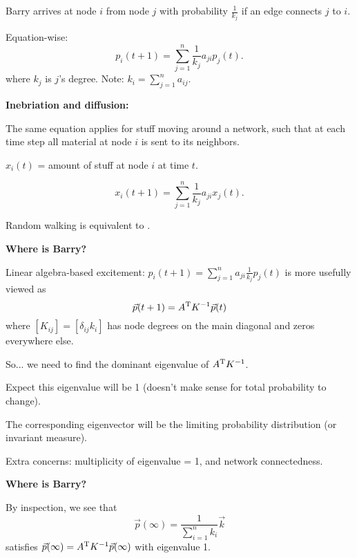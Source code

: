     Barry arrives at node $i$ from node $j$ with probability
    $\frac{1}{k_j}$ if an edge connects $j$ to $i$.
  
    Equation-wise:
    $$
      p_i(t+1) = \sum_{j=1}^{n} \frac{1}{k_j}  a_{ji} p_j(t).
    $$
    where $k_j$ is $j$'s degree.
    {Note: $k_i = \sum_{j=1}^{n} a_{ij}$.}
  


  \textbf{Inebriation and diffusion:}
  
  
  
     The same equation
    applies for stuff moving around a network, such that
    at each time step all material at node $i$ is sent
    to its neighbors.  
  
    $x_i(t)$ = amount of stuff at node $i$ at time $t$.
  
    $$
      x_i(t+1) = \sum_{j=1}^{n} \frac{1}{k_j}  a_{ji} x_j(t).
    $$
  
    Random walking is equivalent to
    .
  

  \textbf{Where is Barry?}

  
  
    Linear algebra-based excitement:
    $
    p_i(t+1) = \sum_{j=1}^{n} a_{ji} \frac{1}{k_j} p_j(t)
    $
    is more usefully viewed as
    $$
    \vec{p}(t+1) 
    = 
    A^{\textnormal{T}} K^{-1}
    \vec{p}(t) 
    $$
    where $[K_{ij}] = [\delta_{ij} k_i]$ 
    has node degrees on the main diagonal
    and zeros everywhere else.
  
    So... we need to find the \alert{dominant eigenvalue} 
    of $A^{\textnormal{T}} K^{-1}$.
  
    Expect this eigenvalue will be 1 (doesn't make sense
    for total probability to change).
  
    The corresponding eigenvector will be the limiting
    probability distribution (or invariant measure).
  
    Extra concerns: multiplicity of eigenvalue = 1,
    and network connectedness.
  


  \textbf{Where is Barry?}

  
  
    By inspection, we see that
    $$
    \vec{p}(\infty) = \frac{1}{\sum_{i=1}^{n} k_i} \vec{k}
    $$
    satisfies
    $
    \vec{p}(\infty)
    = 
    A^{\textnormal{T}} K^{-1}
    \vec{p}(\infty)
    $
    with eigenvalue 1.
  
